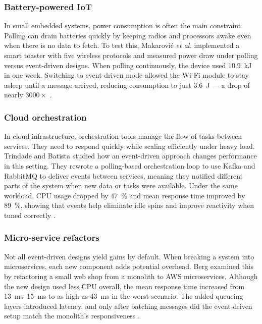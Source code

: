 \documentclass[nomenclature, english, biblatex]{kththesis}
\numberwithin{listing}{chapter}
\begin{document}
\subsubsection{Battery-powered IoT}
In small embedded systems, power consumption is often the main constraint. Polling can drain batteries quickly by keeping radios and processors awake even when there is no data to fetch. 
To test this, Makarović \textit{et al.} implemented a smart toaster with five wireless protocols and measured power draw under polling versus event-driven designs. When polling continuously, the device used \SI{10.9}{\kilo\joule} in one week. Switching to event-driven mode allowed the Wi-Fi module to stay asleep until a message arrived, reducing consumption to just \SI{3.6}{\joule} — a drop of nearly \(3000\times\) \cite{Makarovi2022EnergyEfficientIoT}.

\subsubsection{Cloud orchestration}
In cloud infrastructure, orchestration tools manage the flow of tasks between services. They need to respond quickly while scaling efficiently under heavy load.
Trindade and Batista studied how an event-driven approach changes performance in this setting. They rewrote a polling-based orchestration loop to use Kafka and RabbitMQ to deliver events between services, meaning they notified different parts of the system when new data or tasks were available. Under the same workload, CPU usage dropped by \SI{47}{\percent} and mean response time improved by \SI{89}{\percent}, showing that events help eliminate idle spins and improve reactivity when tuned correctly \cite{Trindade2021EDAImpact}.

\subsubsection{Micro-service refactors}
Not all event-driven designs yield gains by default. When breaking a system into microservices, each new component adds potential overhead. 
Berg examined this by refactoring a small web shop from a monolith to \gls{AWS} microservices. Although the new design used less CPU overall, the mean response time increased from \SIrange{13}{15}{\milli\second} to as high as \SI{43}{\milli\second} in the worst scenario. The added queueing layers introduced latency, and only after batching messages did the event-driven setup match the monolith's responsiveness \cite{Berg2022MonolithVsMicroservices}.
\end{document}
